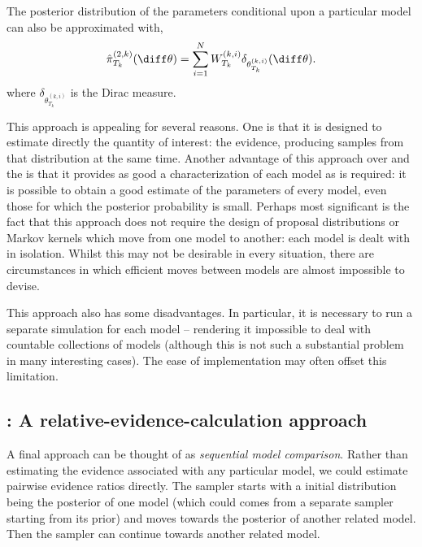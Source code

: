 The posterior distribution of the parameters conditional upon a particular
model can also be approximated with,
\begin{equation*}
  \hat{\pi}_{T_k}^{(2,k)}(\diff\theta) =
  \sum\limits_{i=1}^{N} W_{T_k}^{(k,i)}
  \delta_{\theta^{(k,i)}_{T_k}}(\diff\theta).
\end{equation*}
where $\delta_{\theta^{(k,i)}_{T_k}}$ is the Dirac measure.

This approach is appealing for several reasons. One is that it is designed to
estimate directly the quantity of interest: the evidence, producing samples
from that distribution at the same time. Another advantage of this approach
over \smc[1] and the \rjmcmc is that it provides as good a characterization of
each model as is required: it is possible to obtain a good estimate of the
parameters of every model, even those for which the posterior probability is
small. Perhaps most significant is the fact that this approach does not
require the design of proposal distributions or Markov kernels which move from
one model to another: each model is dealt with in isolation. Whilst this may
not be desirable in every situation, there are circumstances in which
efficient moves between models are almost impossible to devise.

This approach also has some disadvantages. In particular, it is necessary to
run a separate simulation for each model -- rendering it impossible to deal
with countable collections of models (although this is not such a substantial
problem in many interesting cases). The ease of implementation may often
offset this limitation.

\subsection[SMC3: A relative-evidence-calculation approach]
{\smc[3]: A relative-evidence-calculation approach}
\label{sub:smc3: A relative-evidence-calculation approach}

A final approach can be thought of as \emph{sequential model comparison}.
Rather than estimating the evidence associated with any particular model, we
could estimate pairwise evidence ratios directly. The \smc sampler starts with
a initial distribution being the posterior of one model (which could comes
from a separate \smc sampler starting from its prior) and moves towards the
posterior of another related model. Then the sampler can continue towards
another related model.

